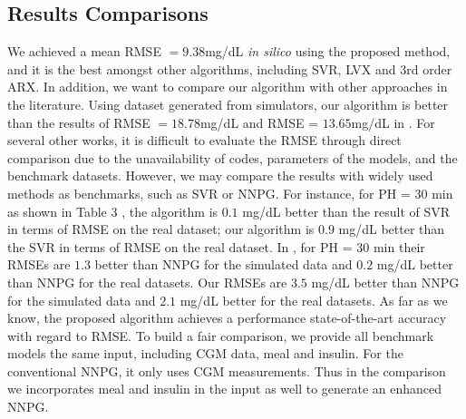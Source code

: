 \documentclass[a4paper, 10 pt, twocolumn]{IEEEtran}
\begin{document}
\subsection{Results Comparisons}
We achieved a mean RMSE $=9.38$mg/dL \emph{in silico} using the proposed method, and it is the best amongst other algorithms, including SVR, LVX and 3rd order ARX. In addition, we want to compare our algorithm with other
approaches in the literature.  {Using dataset generated from simulators,} our algorithm is better than the results of RMSE $= 18.78$mg/dL \cite{Sparacino-GluCon2007} and RMSE = $13.65$mg/dL in
\cite{Mougiakakou-NNbasedGlucose}.
For several other works, it is difficult to evaluate the RMSE through direct comparison  {due to the unavailability of codes, parameters of the models, and the benchmark datasets.} However, we may compare the results with
widely used methods as benchmarks, such as SVR or NNPG.
 For instance, for PH = 30 min as shown in Table 3 \cite{Plis-AMachine2014},  the algorithm is $0.1$ mg/dL better than the result of SVR in terms of RMSE on the real dataset; our algorithm is $0.9$ mg/dL better than the
 SVR in terms of RMSE on the real dataset. In \cite{Zecchin-NNIncor2012}, for PH = 30 min their RMSEs are $1.3$ better than NNPG for the simulated data and $0.2$ mg/dL better than NNPG for the real datasets. Our RMSEs are
 $3.5$ mg/dL better than NNPG for the simulated data and $2.1$ mg/dL better for the real datasets. As far as we know, the proposed algorithm achieves a performance state-of-the-art accuracy with regard to RMSE.
To build a fair comparison, we provide all benchmark models the same input, including CGM data, meal and insulin. For the conventional NNPG, it only uses CGM measurements. Thus in the comparison we incorporates meal and
insulin in the input as well to generate an enhanced NNPG.

\end{document}
